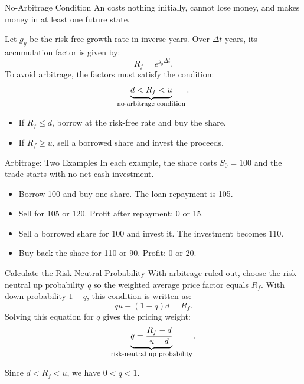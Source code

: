 \documentclass[aspectratio=169,11pt]{beamer}
\begin{document}
\begin{frame}{No-Arbitrage Condition}
  An  costs nothing initially, cannot lose money,
  and makes money in at least one future state.

  Let $g_y$ be the risk-free growth rate in inverse years.
  Over $\Delta t$ years, its accumulation factor is given by:
  \[
    R_f=e^{g_y\Delta t}.
  \]
  To avoid arbitrage, the factors must satisfy the condition:
  \[
    \underbrace{d<R_f<u}_{\text{\footnotesize no-arbitrage condition}}.
  \]

  \begin{itemize}\setlength{\itemsep}{0.5em}
    \item If $R_f\leq d$, borrow at the risk-free rate and buy the share.
    \item If $R_f\geq u$, sell a borrowed share and invest the proceeds.
  \end{itemize}
\end{frame}

\begin{frame}{Arbitrage: Two Examples}
  In each example, the share costs $S_0=100$ and the trade starts with
  no net cash investment.

  \vspace{0.8em}
  \textbf{}
  \begin{itemize}\setlength{\itemsep}{0.4em}
    \item Borrow 100 and buy one share. The loan repayment is 105.
    \item Sell for 105 or 120. Profit after repayment: 0 or 15.
  \end{itemize}

  \vspace{0.8em}
  \textbf{}
  \begin{itemize}\setlength{\itemsep}{0.4em}
    \item Sell a borrowed share for 100 and invest it. The investment becomes 110.
    \item Buy back the share for 110 or 90. Profit: 0 or 20.
  \end{itemize}

\end{frame}

\begin{frame}{Calculate the Risk-Neutral Probability}
  With arbitrage ruled out, choose the risk-neutral up probability $q$
  so the weighted average price factor equals $R_f$.
  With down probability $1-q$, this condition is written as:
  \[
    qu+(1-q)d=R_f.
  \]
  Solving this equation for $q$ gives the pricing weight:
  \[
    \underbrace{q=\frac{R_f-d}{u-d}}_{\text{\footnotesize risk-neutral up probability}}.
  \]

  Since $d<R_f<u$, we have $0<q<1$.

\end{frame}
\end{document}
